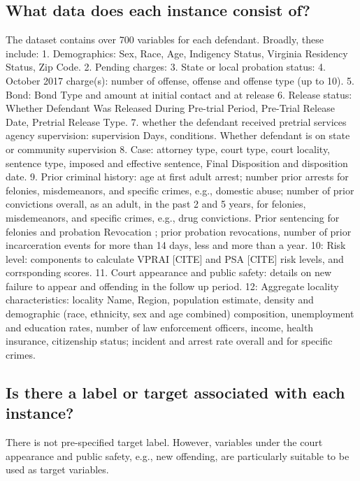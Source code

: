 \documentclass[letterpaper, 10 pt, conference]{ieeeconf}  %
\begin{document}
\subsection{What data does each instance consist of?}

The dataset contains over 700 variables for each defendant. Broadly, these include:
1. Demographics: Sex, Race, Age, Indigency Status, Virginia Residency Status, Zip Code.
2. Pending charges: 
3. State or local probation status: 
4. October 2017 charge(s): number of offense, offense and offense type (up to 10).
5. Bond: Bond Type and amount at initial contact and at release
6. Release status: Whether Defendant Was Released During Pre-trial Period, Pre-Trial Release Date, Pretrial Release Type.
7. whether the defendant received pretrial services agency supervision: supervision Days, conditions. Whether defendant is on state or community supervision
8. Case: attorney type, court type, court locality, sentence type, imposed and effective sentence, Final Disposition and  disposition date. 
9. Prior criminal history: age at first adult arrest; number prior arrests for felonies, misdemeanors, and specific crimes, e.g., domestic abuse; number of prior convictions overall, as an adult, in the past 2 and 5 years, for felonies, misdemeanors, and specific crimes, e.g., drug convictions. Prior sentencing for felonies and probation Revocation ; prior probation revocations, number of prior incarceration events for more than 14 days, less and more than a year.
10: Risk level: components to calculate VPRAI [CITE] and PSA [CITE] risk levels, and corrsponding scores. 
11. Court appearance and public safety: details on new failure to appear and offending in the follow up period.  
12: Aggregate locality characteristics: locality Name, Region, population estimate, density and demographic (race, ethnicity, sex and age combined) composition, unemployment and education rates, number of law enforcement officers, income, health insurance, citizenship status; incident and arrest rate overall and for specific crimes. 

\subsection{Is there a label or target associated with each instance?}

There is not pre-specified target label. However, variables under the court appearance and public safety, e.g., new offending, are particularly suitable to be used as target variables. 
\end{document}
